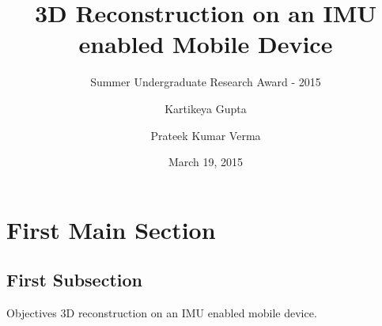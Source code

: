\documentclass{beamer}
\title[3D reconstruction]{3D Reconstruction on an IMU enabled Mobile Device}
\subtitle{Summer Undergraduate Research Award - 2015}
\author[Kartikeya \and Prateek]{Kartikeya Gupta \and Prateek Kumar Verma}
\institute[IITD] %
{
  Department of Computer Science and Engineering\\
  IIT Delhi
  \and
  Under supervision of \\
  \textbf{Prof. Subhashis Banerjee} \\
  Department of Computer Science and Engineering
}
\date{March 19, 2015}
\begin{document}
\begin{frame}
  \titlepage
\end{frame}


\section{First Main Section}

\subsection{First Subsection}

\begin{frame}{Objectives}{}
  3D reconstruction on an IMU enabled mobile device.
\end{frame}
\end{document}
